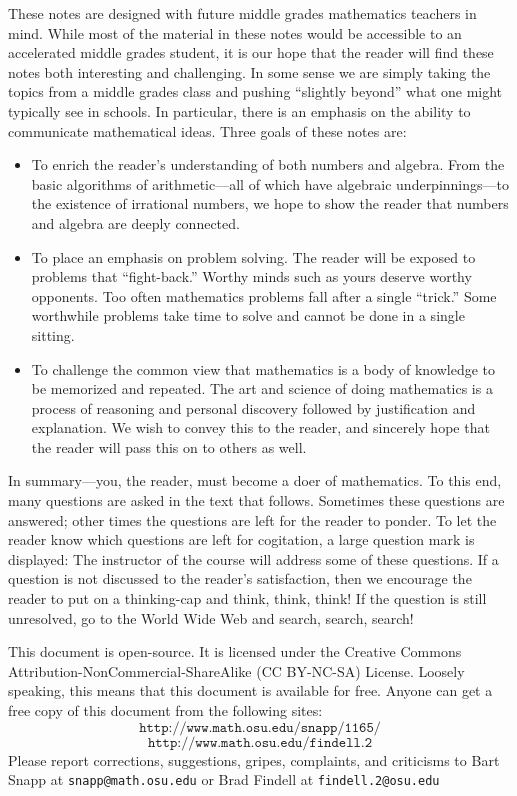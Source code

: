 These notes are designed with future middle grades mathematics
teachers in mind.  While most of the material in these notes would be
accessible to an accelerated middle grades student, it is our hope
that the reader will find these notes both interesting and
challenging.  In some sense we are simply taking the topics from a
middle grades class and pushing ``slightly beyond'' what one might
typically see in schools. In particular, there is an emphasis on the
ability to communicate mathematical ideas.  Three goals of these notes
are:
\begin{itemize}
\item To enrich the reader's understanding of both numbers and algebra. 
From the basic algorithms of arithmetic---all of which have algebraic
underpinnings---to the existence of irrational numbers, we hope to show
the reader that numbers and algebra are deeply connected.
\item To place an emphasis on problem solving. The reader will be exposed 
to problems that ``fight-back.'' Worthy minds such as yours deserve
worthy opponents. Too often mathematics problems fall after a single
``trick.'' Some worthwhile problems take time to solve and cannot be done
in a single sitting.
\item To challenge the common view that mathematics is a body of knowledge 
to be memorized and repeated. The art and science of doing mathematics
is a process of reasoning and personal discovery followed by
justification and explanation. We wish to convey this to the reader,
and sincerely hope that the reader will pass this on to others as
well.
\end{itemize}
In summary---you, the reader, must become a doer of mathematics.  To
this end, many questions are asked in the text that follows. Sometimes
these questions are answered; other times the questions are left for
the reader to ponder. To let the reader know which questions are left
for cogitation, a large question mark is displayed:
\QM
The instructor of the course will address some of these questions. If
a question is not discussed to the reader's satisfaction, then we
encourage the reader to put on a thinking-cap and think, think, think!
If the question is still unresolved, go to the World Wide Web and
search, search, search!

This document is open-source. It is licensed under the Creative
Commons Attribution-NonCommercial-ShareAlike (CC BY-NC-SA)
License. Loosely speaking, this means that this document is available
for free. Anyone can get a free copy of this document 
from the following sites:
\[
\texttt{http://www.math.osu.edu/\~{}snapp/1165/}
\]
\[
\texttt{http://www.math.osu.edu/\~{}findell.2}
\]
Please report corrections, suggestions, gripes, complaints, and
criticisms to Bart Snapp at \texttt{snapp@math.osu.edu} or Brad Findell
at \texttt{findell.2@osu.edu}


